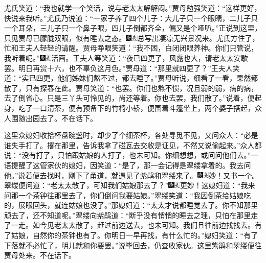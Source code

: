 尤氏笑道：``我也就学一个笑话，说与老太太解解闷。''贾母勉强笑道：``这样更好，快说来我听。''尤氏乃说道：``一家子养了四个儿子：大儿子只一个眼睛，二儿子只一个耳朵，三儿子只一个鼻子眼，四儿子倒都齐全，偏又是个哑叭。''正说到这里，只见贾母已朦胧双眼，似有睡去之态。{\includegraphics[width=3mm]{../Images/00004}\includegraphics[width=3mm]{../Images/00012}\footnotesize \kaishu 总写出凄凉无兴景况来。}尤氏方住了，忙和王夫人轻轻的请醒。贾母睁眼笑道：``我不困，白闭闭眼养神。你们只管说，我听着呢。''{\includegraphics[width=3mm]{../Images/00004}\includegraphics[width=3mm]{../Images/00012}\footnotesize \kaishu 活画。}王夫人等笑道：``夜已四更了，风露也大，请老太太安歇罢。明日再赏十六，也不辜负这月色。''贾母道：``那里就四更了？''王夫人笑道：``实已四更，他们姊妹们熬不过，都去睡了。''贾母听说，细看了一看，果然都散了，只有探春在此。贾母笑道：``也罢。你们也熬不惯，况且弱的弱，病的病，去了倒省心。只是三丫头可怜见的，尚还等着。你也去罢，我们散了。''说着，便起身，吃了一口清茶，便有预备下的竹椅小轿，便围着斗篷坐上，两个婆子搭起，众人围随出园去了。不在话下。

这里众媳妇收拾杯盘碗盏时，却少了个细茶杯，各处寻觅不见，又问众人：``必是谁失手打了。撂在那里，告诉我拿了磁瓦去交收是证见，不然又说偷起来。''众人都说：``没有打了，只怕跟姑娘的人打了，也未可知。你细想想，或问问他们去。''一语提醒了这管家伙的媳妇，因笑道：``是了，那一会记得是翠缕拿着的。我去问他。''说着便去找时，刚下了甬道，就遇见了紫鹃和翠缕来了。{\includegraphics[width=3mm]{../Images/00004}\includegraphics[width=3mm]{../Images/00012}\footnotesize \kaishu 妙！又书一个。}翠缕便问道：``老太太散了，可知我们姑娘那去了？''{\includegraphics[width=3mm]{../Images/00004}\includegraphics[width=3mm]{../Images/00012}\footnotesize \kaishu 更妙！}这媳妇道：``我来问那一个茶钟往那里去了，你们倒问我要姑娘。''翠缕笑道：``我因倒茶给姑娘吃的，展眼回头，就连姑娘也没了。''那媳妇道：``太太才说都睡觉去了。你不知那里顽去了，还不知道呢。''翠缕向紫鹃道：``断乎没有悄悄的睡去之理，只怕在那里走了一走。如今见老太太散了，赶过前边送去，也未可知。我们且往前边找找去。有了姑娘，自然你的茶钟也有了。你明日一早再找，有什么忙的。''媳妇笑道：``有了下落就不必忙了，明儿就和你要罢。''说毕回去，仍查收家伙。这里紫鹃和翠缕便往贾母处来。不在话下。

